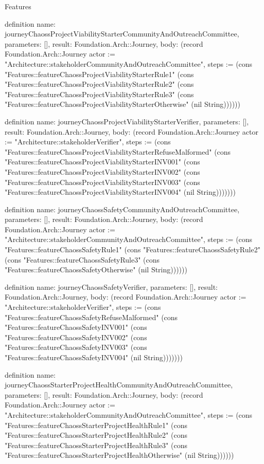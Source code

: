 \begin{lexlean}{Features}
\begin{semanticmodule}
definition{
  name: journeyChaossProjectViabilityStarterCommunityAndOutreachCommittee,
  parameters: [],
  result: Foundation.Arch::Journey,
  body: (record Foundation.Arch::Journey {actor := "Architecture::stakeholderCommunityAndOutreachCommittee", steps := (cons "Features::featureChaossProjectViabilityStarterRule1" (cons "Features::featureChaossProjectViabilityStarterRule2" (cons "Features::featureChaossProjectViabilityStarterRule3" (cons "Features::featureChaossProjectViabilityStarterOtherwise" (nil String)))))})
}

definition{
  name: journeyChaossProjectViabilityStarterVerifier,
  parameters: [],
  result: Foundation.Arch::Journey,
  body: (record Foundation.Arch::Journey {actor := "Architecture::stakeholderVerifier", steps := (cons "Features::featureChaossProjectViabilityStarterRefuseMalformed" (cons "Features::featureChaossProjectViabilityStarterINV001" (cons "Features::featureChaossProjectViabilityStarterINV002" (cons "Features::featureChaossProjectViabilityStarterINV003" (cons "Features::featureChaossProjectViabilityStarterINV004" (nil String))))))})
}

definition{
  name: journeyChaossSafetyCommunityAndOutreachCommittee,
  parameters: [],
  result: Foundation.Arch::Journey,
  body: (record Foundation.Arch::Journey {actor := "Architecture::stakeholderCommunityAndOutreachCommittee", steps := (cons "Features::featureChaossSafetyRule1" (cons "Features::featureChaossSafetyRule2" (cons "Features::featureChaossSafetyRule3" (cons "Features::featureChaossSafetyOtherwise" (nil String)))))})
}

definition{
  name: journeyChaossSafetyVerifier,
  parameters: [],
  result: Foundation.Arch::Journey,
  body: (record Foundation.Arch::Journey {actor := "Architecture::stakeholderVerifier", steps := (cons "Features::featureChaossSafetyRefuseMalformed" (cons "Features::featureChaossSafetyINV001" (cons "Features::featureChaossSafetyINV002" (cons "Features::featureChaossSafetyINV003" (cons "Features::featureChaossSafetyINV004" (nil String))))))})
}

definition{
  name: journeyChaossStarterProjectHealthCommunityAndOutreachCommittee,
  parameters: [],
  result: Foundation.Arch::Journey,
  body: (record Foundation.Arch::Journey {actor := "Architecture::stakeholderCommunityAndOutreachCommittee", steps := (cons "Features::featureChaossStarterProjectHealthRule1" (cons "Features::featureChaossStarterProjectHealthRule2" (cons "Features::featureChaossStarterProjectHealthRule3" (cons "Features::featureChaossStarterProjectHealthOtherwise" (nil String)))))})
}


\end{semanticmodule}
\end{lexlean}
